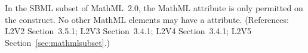 In the SBML subset of MathML~2.0, the MathML attribute
 is only permitted on the  construct.
No other MathML elements may have a  attribute.
(References: L2V2 Section~3.5.1; L2V3 Section~3.4.1; L2V4 Section~3.4.1; 
L2V5 Section~\ref{sec:mathmlsubset}.)

